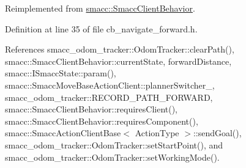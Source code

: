 Reimplemented from \hyperlink{classsmacc_1_1SmaccClientBehavior_a7962382f93987c720ad432fef55b123f}{smacc\+::\+Smacc\+Client\+Behavior}.



Definition at line 35 of file cb\+\_\+navigate\+\_\+forward.\+h.



References smacc\+\_\+odom\+\_\+tracker\+::\+Odom\+Tracker\+::clear\+Path(), smacc\+::\+Smacc\+Client\+Behavior\+::current\+State, forward\+Distance, smacc\+::\+I\+Smacc\+State\+::param(), smacc\+::\+Smacc\+Move\+Base\+Action\+Client\+::planner\+Switcher\+\_\+, smacc\+\_\+odom\+\_\+tracker\+::\+R\+E\+C\+O\+R\+D\+\_\+\+P\+A\+T\+H\+\_\+\+F\+O\+R\+W\+A\+RD, smacc\+::\+Smacc\+Client\+Behavior\+::requires\+Client(), smacc\+::\+Smacc\+Client\+Behavior\+::requires\+Component(), smacc\+::\+Smacc\+Action\+Client\+Base$<$ Action\+Type $>$\+::send\+Goal(), smacc\+\_\+odom\+\_\+tracker\+::\+Odom\+Tracker\+::set\+Start\+Point(), and smacc\+\_\+odom\+\_\+tracker\+::\+Odom\+Tracker\+::set\+Working\+Mode().


